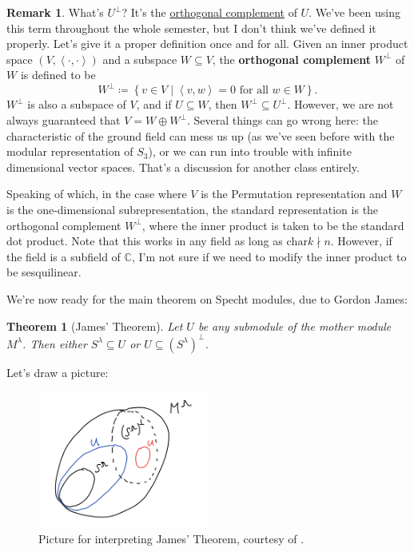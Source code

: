 \documentclass[12pt]{article}
\newcommand{\cx}{\mathbb{C}}
\newcommand\paren[1]{\left( #1 \right)}
\newcommand\setb[1]{\left \{ #1 \right \}}
\newcommand{\vbrack}[1]{\left \langle #1 \right \rangle}
\newtheorem{theorem}{Theorem}[section]
\theoremstyle{definition}
\newtheorem*{remark}{Remark}
\begin{document}
\begin{remark}
    What's $U^{\perp}$? It's the \underline{orthogonal complement} of $U$. We've been using this term throughout the whole semester, but I don't think we've defined it properly. Let's give it a proper definition once and for all. Given an inner product space $\paren{ V , \vbrack{ \cdot , \cdot } }$ and a subspace $W \subseteq V$, the \textbf{orthogonal complement} $W^{\perp}$ of $W$ is defined to be 
    \begin{equation}
        W^{\perp} \coloneqq  \setb{ v \in V \mid \vbrack{v , w} = 0 \text{ for all } w \in W }.
    \end{equation}
    $W^{\perp}$ is also a subspace of $V$, and if $U \subseteq W$, then $W^{\perp} \subseteq U^{\perp}$. However, we are not always guaranteed that $V = W \oplus W^{\perp}$. Several things can go wrong here: the characteristic of the ground field can mess us up (as we've seen before with the modular representation of $S_3$), or we can run into trouble with infinite dimensional vector spaces. That's a discussion for another class entirely.
    
    Speaking of which, in the case where $V$ is the Permutation representation and $W$ is the one-dimensional subrepresentation, the standard representation is the orthogonal complement $W^{\perp}$, where the inner product is taken to be the standard dot product. Note that this works in any field as long as $\mathrm{char} k \nmid n$. However, if the field is a subfield of $\cx$, I'm not sure if we need to modify the inner product to be sesquilinear.
\end{remark}
We're now ready for the main theorem on Specht modules, due to Gordon James:
\begin{theorem}[James' Theorem]
    Let $U$ be any submodule of the mother module $M^{\lambda}$. Then either $S^{\lambda} \subseteq U$ or $U \subseteq \paren{ S^{\lambda} }^{\perp}$.
\end{theorem}
Let's draw a picture:
\begin{figure}[H]
    \centering
    \includegraphics[width=0.5\textwidth]{4.png}
    \caption{Picture for interpreting James' Theorem, courtesy of \cite{Sean}.}
    \label{fig:Figure4}
\end{figure}
\end{document}
